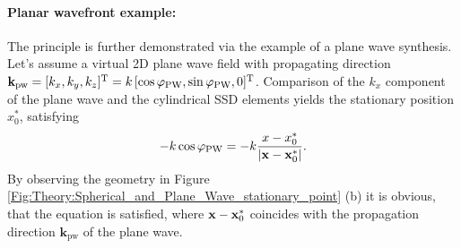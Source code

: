 \paragraph{Planar wavefront example: \\}
The principle is further demonstrated via the example of a plane wave synthesis.
Let's assume a virtual 2D plane wave field with propagating direction $\mathbf{k}_\text{pw}=[k_x,k_y,k_z]^{\mathrm{T}}=k\,[\cos\varphi_\text{PW},\sin\varphi_\text{PW},0]^{\mathrm{T}}$.
Comparison of the $k_x$ component of the plane wave and the cylindrical SSD elements yields the stationary position $x_0^*$, satisfying
\begin{equation}
\label{Eq:Phix0_PlaneWaveExample}
- k \cos\varphi_\text{PW} = -k \frac{x-x_0^*}{|\mathbf{x} - \mathbf{x}_0^*|}.
\end{equation}
By observing the geometry in Figure \ref{Fig:Theory:Spherical_and_Plane_Wave_stationary_point} (b) it is obvious, that the equation is satisfied, where $\mathbf{x}-\mathbf{x}_0^*$ coincides with the propagation direction $\mathbf{k}_\text{pw}$ of the plane wave.


